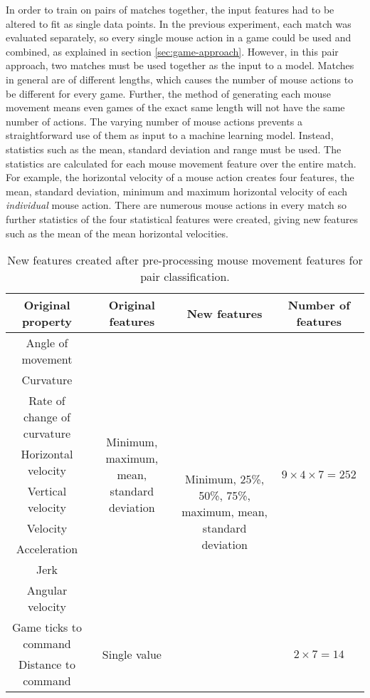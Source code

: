 \documentclass[Report.tex]{subfiles}
\begin{document}
In order to train on pairs of matches together, the input features had to be altered to fit as single data points. In the previous experiment, each match was evaluated separately, so every single mouse action in a game could be used and combined, as explained in section \ref{sec:game-approach}. However, in this pair approach, two matches must be used together as the input to a model. Matches in general are of different lengths, which causes the number of mouse actions to be different for every game. Further, the method of generating each mouse movement means even games of the exact same length will not have the same number of actions. The varying number of mouse actions prevents a straightforward use of them as input to a machine learning model. Instead, statistics such as the mean, standard deviation and range must be used. The statistics are calculated for each mouse movement feature over the entire match. For example, the horizontal velocity of a mouse action creates four features, the mean, standard deviation, minimum and maximum horizontal velocity of each \textit{individual} mouse action. There are numerous mouse actions in every match so further statistics of the four statistical features were created, giving new features such as the mean of the mean horizontal velocities. 

\begin{table}[H]
\centering
\begin{tabular}{| c | c | c | c |}
\hline
\textbf{Original property} & \textbf{Original features} & \textbf{New features} & \textbf{Number of features} \\ \hline
Angle of movement & \multirow{9}{3cm}{Minimum, maximum, mean, standard deviation} & \multirow{11}{3cm}{Minimum, 25\%, 50\%, 75\%, maximum, mean, standard deviation} & \multirow{9}{*}{$ 9 \times 4 \times 7 = 252 $} \\ \cline{1-1}
Curvature &  &  &  \\ \cline{1-1}
Rate of change of curvature &  &  &  \\ \cline{1-1}
Horizontal velocity &  &  &  \\ \cline{1-1}
Vertical velocity &  &  &  \\ \cline{1-1}
Velocity &  &  &  \\ \cline{1-1}
Acceleration &  &  &  \\ \cline{1-1}
Jerk &  &  &  \\\cline{1-1}
Angular velocity & & & \\ \cline{1-2} \cline{4-4}
Game ticks to command & \multirow{2}{*}{Single value} & & \multirow{2}{*}{$ 2  \times 7 = 14 $} \\ \cline{1-1}
Distance to command & & & \\ \hline
\end{tabular}
\caption{New features created after pre-processing mouse movement features for pair classification.}
\end{table}
\end{document}
